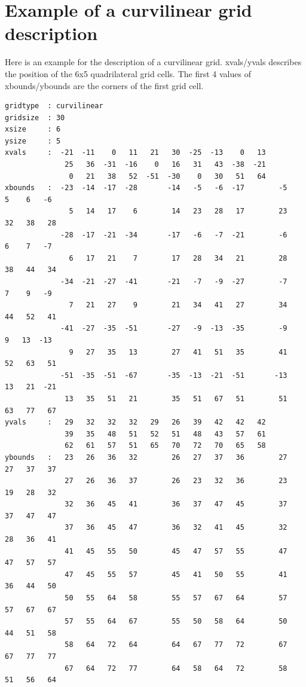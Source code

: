 \section{Example of a curvilinear grid description}
Here is an example for the {\CDO} description of a curvilinear grid.
xvals/yvals describes the position of the 6x5 quadrilateral grid cells.
The first 4 values of xbounds/ybounds are the corners of the first grid cell.
\begin{lstlisting}[frame=single, backgroundcolor=\color{zebg}, basicstyle=\footnotesize]
gridtype  : curvilinear
gridsize  : 30
xsize     : 6
ysize     : 5
xvals     :  -21  -11    0   11   21   30  -25  -13    0   13
              25   36  -31  -16    0   16   31   43  -38  -21
               0   21   38   52  -51  -30    0   30   51   64
xbounds   :  -23  -14  -17  -28       -14   -5   -6  -17        -5    5    6   -6
               5   14   17    6        14   23   28   17        23   32   38   28
             -28  -17  -21  -34       -17   -6   -7  -21        -6    6    7   -7
               6   17   21    7        17   28   34   21        28   38   44   34
             -34  -21  -27  -41       -21   -7   -9  -27        -7    7    9   -9
               7   21   27    9        21   34   41   27        34   44   52   41
             -41  -27  -35  -51       -27   -9  -13  -35        -9    9   13  -13
               9   27   35   13        27   41   51   35        41   52   63   51
             -51  -35  -51  -67       -35  -13  -21  -51       -13   13   21  -21
              13   35   51   21        35   51   67   51        51   63   77   67
yvals     :   29   32   32   32   29   26   39   42   42   42
              39   35   48   51   52   51   48   43   57   61
              62   61   57   51   65   70   72   70   65   58
ybounds   :   23   26   36   32        26   27   37   36        27   27   37   37
              27   26   36   37        26   23   32   36        23   19   28   32
              32   36   45   41        36   37   47   45        37   37   47   47
              37   36   45   47        36   32   41   45        32   28   36   41
              41   45   55   50        45   47   57   55        47   47   57   57
              47   45   55   57        45   41   50   55        41   36   44   50
              50   55   64   58        55   57   67   64        57   57   67   67
              57   55   64   67        55   50   58   64        50   44   51   58
              58   64   72   64        64   67   77   72        67   67   77   77
              67   64   72   77        64   58   64   72        58   51   56   64
\end{lstlisting}

